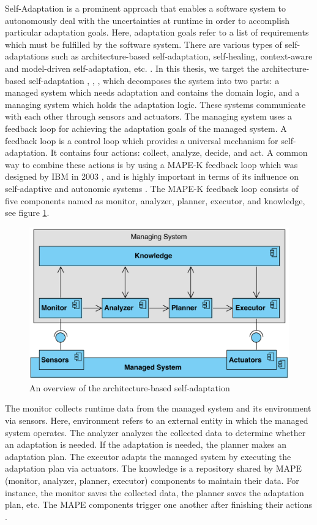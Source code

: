\documentclass[a4paper,12pt]{article}
\begin{document}
Self-Adaptation is a prominent approach that enables a software system to autonomously deal with the uncertainties at runtime in order to accomplish particular adaptation goals. Here, adaptation goals refer to a list of requirements which must be fulfilled by the software system. There are various types of self-adaptations such as architecture-based self-adaptation, self-healing, context-aware and model-driven self-adaptation, etc. \cite{SEFSAS-2009}. In this thesis, we target the architecture-based self-adaptation \cite{ABRSE-1998}, \cite{RABSAWRI-2004}, \cite{MDOSASS-2009}, \cite{FORMSURMFFSODSAS-2012} which decomposes the system into two parts: a managed system which needs adaptation and contains the domain logic, and a managing system which holds the adaptation logic. These systems communicate with each other through sensors and actuators. The managing system uses a feedback loop for achieving the adaptation goals of the managed system. A feedback loop is a control loop which provides a universal mechanism for self-adaptation. It contains four actions: collect, analyze, decide, and act. A common way to combine these actions is by using a MAPE-K feedback loop which was designed by IBM in 2003 \cite{AABFAC-2005}, \cite{DEFLITDOSASACE-2013} and is highly important in terms of its influence on self-adaptive and autonomic systems \cite{MAAMAPEKFLFSA-2015}. The MAPE-K feedback loop consists of five components named as monitor, analyzer, planner, executor, and knowledge, see figure \ref{SelfAdaptiveSystem}.
\begin{figure}[H]
	\centering
	\includegraphics[keepaspectratio, width=\linewidth]{figures/SelfAdaptiveSystem.pdf}
	\caption{An overview of the architecture-based self-adaptation}
	\label{SelfAdaptiveSystem}
\end{figure} 
The monitor collects runtime data from the managed system and its environment via sensors. Here, environment refers to an external entity in which the managed system operates. The analyzer analyzes the collected data to determine whether an adaptation is needed. If the adaptation is needed, the planner makes an adaptation plan. The executor adapts the managed system by executing the adaptation plan via actuators. The knowledge is a repository shared by MAPE (monitor, analyzer, planner, executor) components to maintain their data. For instance, the monitor saves the collected data, the planner saves the adaptation plan, etc. The MAPE components trigger one another after finishing their actions \cite{MBSARFSAS-2016}.
\end{document}
